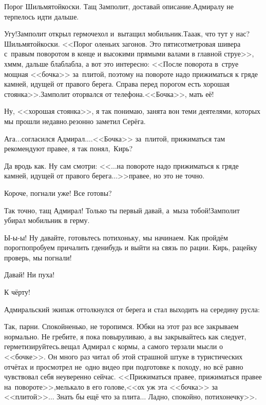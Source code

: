 \diagdash Порог Шильмятойкоски. Тащ Замполит, доставай описание.\mdash Адмиралу не терпелось идти дальше.

\diagdash Угу!\mdash Замполит открыл гермочехол и~вытащил мобильник.\mdash Та\sdash а\sdash ак, что тут у нас? Шильмятойкоски. <<Порог оленьих загонов. Это пятисотметровая шивера с~правым поворотом в конце и высокими прямыми валами в главной струе>>, хм\sdash м\sdash м, дальше бла\sdash бла\sdash бла, а вот это интересно: <<После поворота в~струе мощная <<бочка>> за~плитой, поэтому на повороте надо прижиматься к гряде камней, идущей от правого берега. Справа перед порогом есть хорошая стоянка>>.\mdash Замполит оторвался от телефона.\mdash <<Бочка>>, мать её!

\diagdash Ну, <<хорошая стоянка>>, я так понимаю, занята вон теми деятелями, которых мы прошли недавно.\mdash резонно заметил Серёга.

\diagdash Ага$\ldots$\mdash согласился Адмирал.\mdash$\ldots$<<Бочка>> за~плитой, прижиматься там рекомендуют правее, я так понял,~Кирь?

\diagdash Да вродь как. Ну сам смотри: <<$\ldots$на повороте надо прижиматься к гряде камней, идущей от правого берега$\ldots$>>\mdash правее, но это не точно.

\diagdash Короче, погнали уже! Все готовы?

\diagdash Так точно, тащ Адмирал! Только ты первый давай, а~мы\mdash за тобой!\mdash Замполит убирал мобильник в герму.

\diagdash Ы-ы-ы! Ну давайте, готовьтесь потихоньку, мы начинаем. Как пройдём порог\mdash попробуем причалить где\sdash нибудь и выйти на связь по рации. Кирь, рацейку проверь, мы погнали!

\diagdash Давай! Ни пуха!

\diagdash К чёрту!

Адмиральский экипаж оттолкнулся от берега и стал выходить на середину русла:

\diagdash Так, парни. Спокойненько, не торопимся. Юбки на этот раз все закрываем нормально. Не гребите, я пока повыруливаю, а вы закрывайтесь как следует, герметизируйтесь.\mdash вещал Адмирал с кормы, а самого терзали мысли о <<бочке>>. Он много раз читал об этой страшной штуке в туристических отчётах и просмотрел не~одно видео при подготовке к походу, но всё равно чувствовал себя неуверенно сейчас. <<Прижиматься правее, прижиматься правее на~повороте>>,\mdash мелькало в его голове,\mdash<<ох уж эта <<бочка>> за <<плитой>>$\ldots$ Знать бы ещё что за плита$\ldots$ Ладно, спокойно, потихонечку>>.


